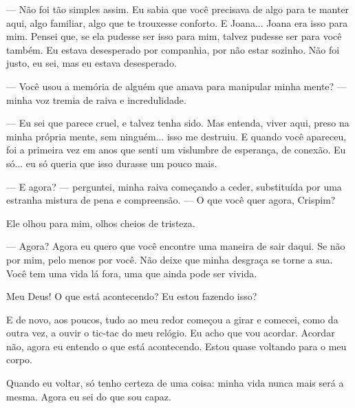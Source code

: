 — Não foi tão simples assim. Eu sabia que você precisava de algo para te manter aqui, algo familiar, algo que te trouxesse conforto. E Joana... Joana era isso para mim. Pensei que, se ela pudesse ser isso para mim, talvez pudesse ser para você também. Eu estava desesperado por companhia, por não estar sozinho. Não foi justo, eu sei, mas eu estava desesperado.

— Você usou a memória de alguém que amava para manipular minha mente? — minha voz tremia de raiva e incredulidade.

— Eu sei que parece cruel, e talvez tenha sido. Mas entenda, viver aqui, preso na minha própria mente, sem ninguém... isso me destruiu. E quando você apareceu, foi a primeira vez em anos que senti um vislumbre de esperança, de conexão. Eu só... eu só queria que isso durasse um pouco mais.

— E agora? — perguntei, minha raiva começando a ceder, substituída por uma estranha mistura de pena e compreensão. — O que você quer agora, Crispim?

Ele olhou para mim, olhos cheios de tristeza.

— Agora? Agora eu quero que você encontre uma maneira de sair daqui. Se não por mim, pelo menos por você. Não deixe que minha desgraça se torne a sua. Você tem uma vida lá fora, uma que ainda pode ser vivida.

Meu Deus! O que está acontecendo? Eu estou fazendo isso?

E de novo, aos poucos, tudo ao meu redor começou a girar e comecei, como da outra vez, a ouvir o tic-tac do meu relógio. Eu acho que vou acordar. Acordar não, agora eu entendo o que está acontecendo. Estou quase voltando para o meu corpo.

Quando eu voltar, só tenho certeza de uma coisa: minha vida nunca mais será a mesma. Agora eu sei do que sou capaz.